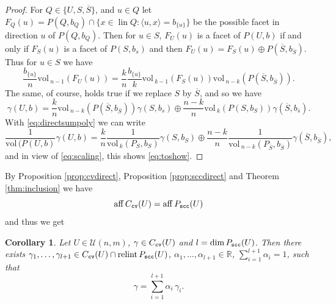 \documentclass[11pt, a4paper, twoside, reqno]{amsart}
\DeclareMathOperator*{\lin}{lin}
\DeclareMathOperator*{\aff}{aff}
\newcommand{\R}{\mathbb{R}}
\newtheorem{corollary}[theorem]{Corollary}
\theoremstyle{definition}
\theoremstyle{remark}
\newcommand{\vol}{\mathrm{vol}\,}
\newcommand{\scc}{{\tt scc}}
\newcommand{\cv}{{\tt cv}}
\newcommand{\ov}{\overline}
\DeclareMathOperator{\relint}{relint}
\numberwithin{equation}{section}
\begin{document}
\begin{proof}
     For $Q\in\{U,S,\ov S\}$, and $u\in Q$  let
     $F_Q(u)=P(Q,b_Q)\cap\{x\in \lin Q: \langle u,x\rangle =
     b_{\{u\}}\}$ be the possible facet in direction $u$ of $P(Q,b_Q)$.
     Then for $u\in S$, $F_U(u)$ is a facet of $P(U,b)$ if and only if
     $F_S(u)$ is a facet of $P(S,b_s)$ and then $F_U(u)=F_S(u)\oplus P(\ov
     S,b_{\ov S})$. Thus for $u\in S$ we have
     \begin{equation*}
        \frac{b_{\{u\}}}{n}\vol_{n-1}(F_U(u)) = \frac{k}{n}\frac{b_{\{ u\}}}{k}
        \vol_{k-1}(F_S(u))\vol_{n-k}(P(\ov S,b_{\ov S})).
     \end{equation*}
       The same, of course, holds true if we replace $S$ by $\ov
       S$, and so we have
       \begin{equation*}
          \gamma(U,b)= \frac{k}{n} \vol_{n-k}(P(\ov S,b_{\ov
            S}))\gamma(S,b_s) \oplus \frac{n-k}{n} \vol_{k}(P(S,b_{
            S}))\gamma(\ov S,b_{\ov s}).
       \end{equation*}
       With \eqref{eq:directsumpoly} we can write
       \begin{equation*}
         \frac{1}{\vol(P(U,b)}\gamma(U,b) =\frac{k}{n} \frac{1}{\vol_k(P_S,b_S)}
         \gamma(S,b_S) \oplus \frac{n-k}{n} \frac{1}{\vol_{n-k}(P_{\ov
             S},b_{\ov S})} \gamma(\ov S,b_{\ov S}),
       \end{equation*}
and in view of \eqref{eq:scaling}, this shows \eqref{eq:toshow}.
\end{proof}

By Proposition \ref{prop:cvdirect}, Proposition
\ref{prop:sccdirect} and Theorem \ref{thm:inclusion} we have
\begin{equation*}
   \aff C_\cv(U)=\aff P_\scc(U)
\end{equation*}
and thus we get
\begin{corollary}
    \label{PropositionPconeAffineCombinationOfPscc}
    Let $U \in\mathcal{U}(n,m)$, $\gamma\in C_\cv(U)$ and $l=\dim P_{\scc}(U)$. Then
    there exists $\gamma_1,\dots,\gamma_{l+1}\in C_{\cv}(U)\cap \relint
    P_{\scc}(U)$, $\alpha_1,\dots,\alpha_{l+1}\in\R$, $\sum_{i=1}^{l+1}
    \alpha_i=1$, such that
    \begin{equation*}
       \gamma=\sum_{i=1}^{l+1}\alpha_i\,\gamma_i.
    \end{equation*}
\end{corollary}
\end{document}
